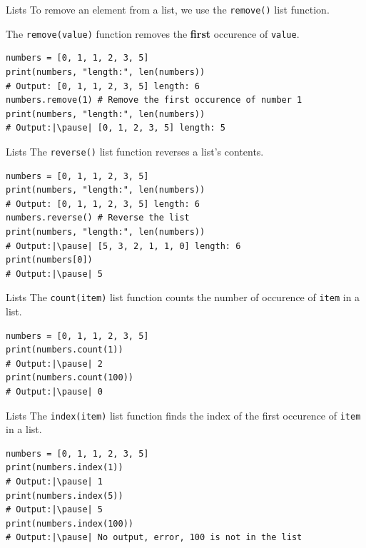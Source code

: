 \documentclass[dvipsnames, svgnames, x11names, handout]{beamer}
\begin{document}
\begin{frame}[fragile]{Lists}
To remove an element from a list, we use the \texttt{remove()} list function.

The \texttt{remove(value)} function removes the \textbf{first} occurence of \texttt{value}. \pause
\begin{verbatim}
numbers = [0, 1, 1, 2, 3, 5]
print(numbers, "length:", len(numbers)) 
# Output: [0, 1, 1, 2, 3, 5] length: 6
numbers.remove(1) # Remove the first occurence of number 1
print(numbers, "length:", len(numbers))
# Output:|\pause| [0, 1, 2, 3, 5] length: 5
\end{verbatim}
\end{frame}

\begin{frame}[fragile]{Lists}
The \texttt{reverse()} list function reverses a list's contents. \pause

\begin{verbatim}
numbers = [0, 1, 1, 2, 3, 5]
print(numbers, "length:", len(numbers)) 
# Output: [0, 1, 1, 2, 3, 5] length: 6
numbers.reverse() # Reverse the list
print(numbers, "length:", len(numbers)) 
# Output:|\pause| [5, 3, 2, 1, 1, 0] length: 6
print(numbers[0])
# Output:|\pause| 5
\end{verbatim}
\end{frame}

\begin{frame}[fragile]{Lists}
The \texttt{count(item)} list function counts the number of occurence of \texttt{item} in a list. \pause

\begin{verbatim}
numbers = [0, 1, 1, 2, 3, 5]
print(numbers.count(1)) 
# Output:|\pause| 2
print(numbers.count(100)) 
# Output:|\pause| 0
\end{verbatim}
\end{frame}

\begin{frame}[fragile]{Lists}
The \texttt{index(item)} list function finds the index of the first occurence of \texttt{item} in a list. \pause

\begin{verbatim}
numbers = [0, 1, 1, 2, 3, 5]
print(numbers.index(1)) 
# Output:|\pause| 1
print(numbers.index(5)) 
# Output:|\pause| 5
print(numbers.index(100))
# Output:|\pause| No output, error, 100 is not in the list
\end{verbatim}
\end{frame}
\end{document}
